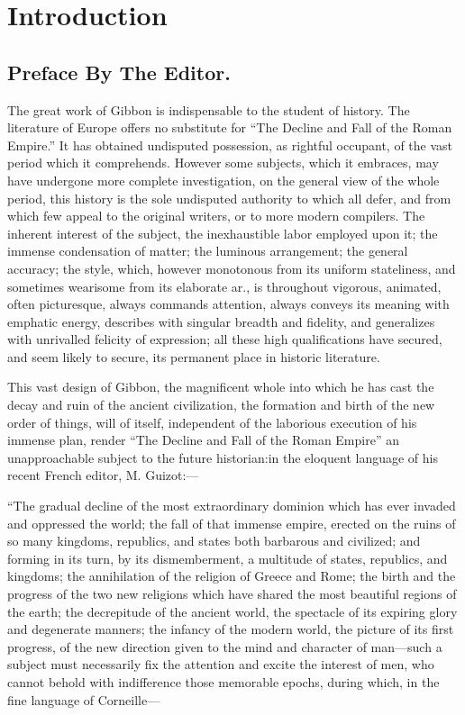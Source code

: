 \section{Introduction}
\subsection{Preface By The Editor.}
\thispagestyle{simple}

The great work of Gibbon is indispensable to the student of history. The literature of Europe offers no substitute for “The Decline and Fall of the Roman Empire.” It has obtained undisputed possession, as rightful occupant, of the vast period which it comprehends. However some subjects, which it embraces, may have undergone more complete investigation, on the general view of the whole period, this history is the sole undisputed authority to which all defer, and from which few appeal to the original writers, or to more modern compilers. The inherent interest of the subject, the inexhaustible labor employed upon it; the immense condensation of matter; the luminous arrangement; the general accuracy; the style, which, however monotonous from its uniform stateliness, and sometimes wearisome from its elaborate ar., is throughout vigorous, animated, often picturesque, always commands attention, always conveys its meaning with emphatic energy, describes with singular breadth and fidelity, and generalizes with unrivalled felicity of expression; all these high qualifications have secured, and seem likely to secure, its permanent place in historic literature.

This vast design of Gibbon, the magnificent whole into which he has cast the decay and ruin of the ancient civilization, the formation and birth of the new order of things, will of itself, independent of the laborious execution of his immense plan, render “The Decline and Fall of the Roman Empire” an unapproachable subject to the future historian:\footnotemark[101] in the eloquent language of his recent French editor, M. Guizot:—


“The gradual decline of the most extraordinary dominion which has ever invaded and oppressed the world; the fall of that immense empire, erected on the ruins of so many kingdoms, republics, and states both barbarous and civilized; and forming in its turn, by its dismemberment, a multitude of states, republics, and kingdoms; the annihilation of the religion of Greece and Rome; the birth and the progress of the two new religions which have shared the most beautiful regions of the earth; the decrepitude of the ancient world, the spectacle of its expiring glory and degenerate manners; the infancy of the modern world, the picture of its first progress, of the new direction given to the mind and character of man—such a subject must necessarily fix the attention and excite the interest of men, who cannot behold with indifference those memorable epochs, during which, in the fine language of Corneille—

